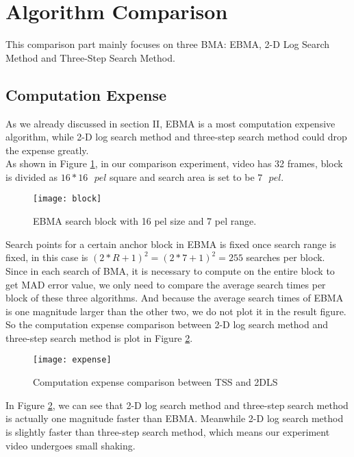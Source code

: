 \documentclass[a4paper, twocolumn]{article}
\begin{document}
	\section{Algorithm Comparison}
	This comparison part mainly focuses on three BMA: EBMA, 2-D Log Search Method and Three-Step Search Method.
	\subsection{Computation Expense}
	As we already discussed in section II, EBMA is a most computation expensive algorithm, while 2-D log search method and three-step search method could drop the expense greatly. \\
	 As shown in Figure \ref{fig:block}, in our comparison experiment, video has 32 frames, block is divided as $ 16*16 \textit{ } pel $ square and search area is set to be $ 7 \textit{ } pel $.\\
	\begin{figure}[hb]
	\centering
	\texttt{[image: block]}
	\caption{EBMA search block with 16 pel size and 7 pel range.}
	\label{fig:block}
	\end{figure}
	
	\noindent
	Search points for a certain anchor block in EBMA is fixed once search range is fixed, in this case is $ (2*R+1)^2 = (2*7+1)^2=255 $ searches per block.\\
	Since in each search of BMA, it is necessary to compute on the entire block to get MAD error value, we only need to compare the average search times per block of these three algorithms. And because the average search times of EBMA is one magnitude larger than the other two, we do not plot it in the result figure. So the computation expense comparison between 2-D log search method and three-step search method is plot in Figure \ref{fig:expense}.
	\begin{figure}[h]
	\centering
	\texttt{[image: expense]}
	\caption{Computation expense comparison between TSS and 2DLS}
	\label{fig:expense}
	\end{figure}
	
	\noindent
	In Figure \ref{fig:expense}, we can see that 2-D log search method and three-step search method is actually one magnitude faster than EBMA. Meanwhile 2-D log search method is slightly faster than three-step search method, which means our experiment video undergoes small shaking.
	
\end{document}

